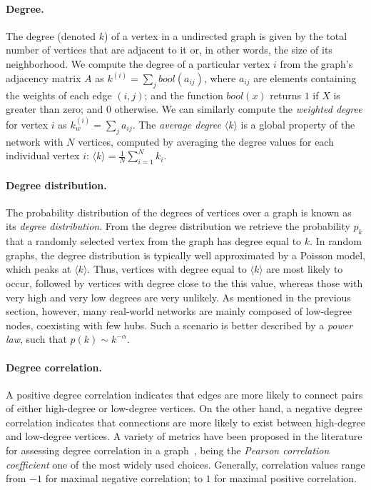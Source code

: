 \paragraph*{Degree.}
The degree (denoted $k$) of a vertex in a undirected graph is given by the total number of vertices that are adjacent to it or, in other words, the size of its neighborhood.
We compute the degree of a particular vertex $i$ from the graph's adjacency matrix $A$ as 
$
k^{(i)} = \sum_j bool(a_{i j})
$,
where $a_{i j}$ are elements containing the weights of each edge $(i,j)$; and the function $bool(x)$ returns $1$ if $X$ is greater than zero; and $0$ otherwise.
We can similarly compute the \textit{weighted degree} for vertex $i$ as $ k_{w}^{(i)} = \sum_j a_{i j} $.
The \textit{average degree} 
$\langle k \rangle$ 
is a global property of the network with $N$ vertices, computed by averaging the degree values for each individual vertex $i$:
$\langle k \rangle = \frac{1}{N} \sum_{i=1}^N k_i$.


\paragraph*{Degree distribution.}
The probability distribution of the degrees of vertices over a graph is known as its \textit{degree distribution}.
From the degree distribution we retrieve the probability $p_k$ that a randomly selected vertex from the graph has degree equal to $k$.
In random graphs, the degree distribution is typically well approximated by a Poisson model, which peaks at $\langle k \rangle$.
Thus, vertices with degree equal to $\langle k \rangle$ are most likely to occur, followed by vertices with degree close to the this value, whereas those with very high and very low degrees are very unlikely. 
As mentioned in the previous section, however, many real-world networks are mainly composed of low-degree nodes, coexisting with few hubs.
Such a scenario is better described by a \textit{power law}, such that $p(k) \sim k^{-\alpha}$.

\paragraph*{Degree correlation.}
A positive degree correlation indicates that edges are more likely to connect pairs of either high-degree or low-degree vertices.
On the other hand, a negative degree correlation indicates that connections are more likely to exist between high-degree and low-degree vertices.
A variety of metrics have been proposed in the literature for assessing degree correlation in a graph~\cite{Newman2003b}, being the \textit{Pearson correlation coefficient} one of the most widely used choices. Generally, correlation values range from $-1$ for maximal negative correlation; to $1$ for maximal positive correlation. 

